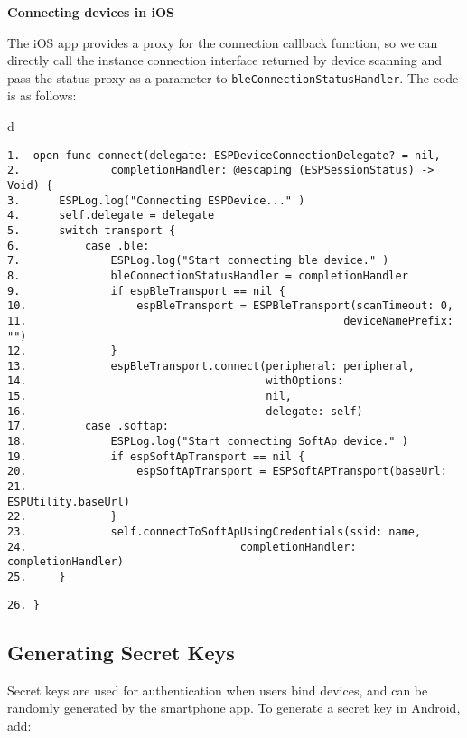 \documentclass[a4paper,12pt]{book}
\begin{document}
\textbf{Connecting devices in iOS}

The iOS app provides a proxy for the connection callback function, so we can directly call the instance connection interface returned by device scanning and pass the status proxy as a parameter to \verb|bleConnectionStatusHandler|. The code is as follows:


\begin{codebloc}
\begin{tabular}{d}
\vspace{2pt}
\begin{verbatim}
1.  open func connect(delegate: ESPDeviceConnectionDelegate? = nil,
2.              completionHandler: @escaping (ESPSessionStatus) -> Void) {
3.      ESPLog.log("Connecting ESPDevice..." )
4.      self.delegate = delegate
5.      switch transport {
6.          case .ble:
7.              ESPLog.log("Start connecting ble device." )
8.              bleConnectionStatusHandler = completionHandler
9.              if espBleTransport == nil {
10.                 espBleTransport = ESPBleTransport(scanTimeout: 0,
11.                                                 deviceNamePrefix: "")
12.             }
13.             espBleTransport.connect(peripheral: peripheral, 
14.                                     withOptions:
15.                                     nil, 
16.                                     delegate: self) 
17.         case .softap:
18.             ESPLog.log("Start connecting SoftAp device." )
19.             if espSoftApTransport == nil {
20.                 espSoftApTransport = ESPSoftAPTransport(baseUrl:
21.                                                     ESPUtility.baseUrl)
22.             }
23.             self.connectToSoftApUsingCredentials(ssid: name,
24.                                 completionHandler: completionHandler)
25.     }
\end{verbatim}
\verb|26. }|
\end{tabular}
\end{codebloc}

\subsection{Generating Secret Keys}
Secret keys are used for authentication when users bind devices, and can be randomly generated by the smartphone app. To generate a secret key in Android, add:
\end{document}
